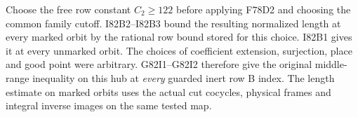 Choose the free row constant $C_2\ge122$ before applying
F78D2 and choosing the common family cutoff. I82B2--I82B3
bound the resulting normalized length at every marked orbit
by the rational row bound stored for this choice. I82B1 gives
it at every unmarked orbit. The choices of coefficient
extension, surjection, place and good point were arbitrary.
G82I1--G82I2 therefore give the original middle-range
inequality on this hub at \emph{every} guarded inert row B
index. The length estimate on marked orbits uses the actual
cut cocycles, physical frames and integral inverse images on
the same tested map.
